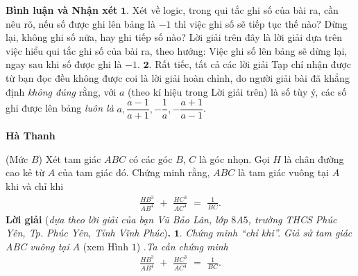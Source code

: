 \begin{multicols}{2}
	\vskip 0.05cm
	\textbf{Bình luận và Nhận xét}
	\vskip 0.05cm
	$\pmb{1.}$ Xét về logic, trong qui tắc ghi số của bài ra, cần nêu rõ, nếu số được ghi lên bảng là $-1$ thì việc ghi số sẽ tiếp tục thế nào? Dừng lại, không ghi số nữa, hay ghi tiếp số nào? Lời giải trên đây là lời giải dựa trên việc hiểu qui tắc ghi số của bài ra, theo hướng: Việc ghi số lên bảng sẽ dừng lại, ngay sau khi số được ghi là $-1$.
	\vskip 0.05cm
	$\pmb{2.}$ Rất tiếc, tất cả các lời giải Tạp chí nhận được từ bạn đọc đều không được coi là lời giải hoàn chỉnh, do người giải bài đã khẳng định \textit{không đúng} rằng, với $a$ (theo kí hiệu trong Lời giải trên) là số tùy ý, các số ghi được lên bảng \textit{luôn là} $a, \dfrac{a-1}{a+1}, - \dfrac{1}{a}, - \dfrac{a+1}{a-1}$.      
	\begin{flushright}
		\textbf{Hà Thanh}
	\end{flushright}
	{}
	(Mức $B$)
	Xét tam giác $ABC$ có các góc $B$, $C$ là góc nhọn. Gọi $H$ là chân đường cao kẻ từ $A$ của tam giác đó. Chứng minh rằng, $ABC$ là tam giác vuông tại $A$ khi và chỉ khi
	\begin{align*}
		\frac{{H{B^3}}}{{A{B^4}}}\,\, + \,\,\frac{{H{C^3}}}{{A{C^4}}}\,\, = \,\,\frac{1}{{BC}}.
	\end{align*}
	\textbf{Lời giải} (\textit{dựa theo lời giải của bạn Vũ Bảo Lân, lớp $8$A$5$, trường THCS Phúc Yên, Tp. Phúc Yên, Tỉnh Vĩnh Phúc})\textbf{.}
	\vskip 0.05cm
	$\pmb{1.}$ \textit{Chứng minh “chỉ khi”.
	Giả sử tam giác ABC vuông tại} $A$ (xem Hình $1$) .\textit{Ta cần chứng minh}
	\begin{align*}
		\frac{{H{B^3}}}{{A{B^4}}}\,\, + \,\,\frac{{H{C^3}}}{{A{C^4}}}\,\, = \,\,\frac{1}{{BC}}.
	\end{align*}                                                           
	
	

\end{multicols}
